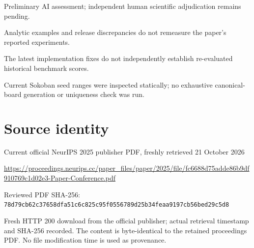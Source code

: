 \documentclass[11pt]{article}
\begin{document}
Preliminary AI assessment; independent human scientific adjudication remains pending.\par

Analytic examples and release discrepancies do not remeasure the paper’s reported experiments.\par

The latest implementation fixes do not independently establish re-evaluated historical benchmark scores.\par

Current Sokoban seed ranges were inspected statically; no exhaustive canonical-board generation or uniqueness check was run.\par

\section*{Source identity}

Current official NeurIPS 2025 publisher PDF, freshly retrieved 21 October 2026

\url{https://proceedings.neurips.cc/paper_files/paper/2025/file/fc6688d75adde86b9df910769c1d02e3-Paper-Conference.pdf}

Reviewed PDF SHA-256: \nolinkurl{78d79cb62c37658dfa51c6c825c95f0556789d25b34feaa9197cb56bed29c5d8}

Fresh HTTP 200 download from the official publisher; actual retrieval timestamp and SHA-256 recorded. The content is byte-identical to the retained proceedings PDF. No file modification time is used as provenance.
\end{document}
